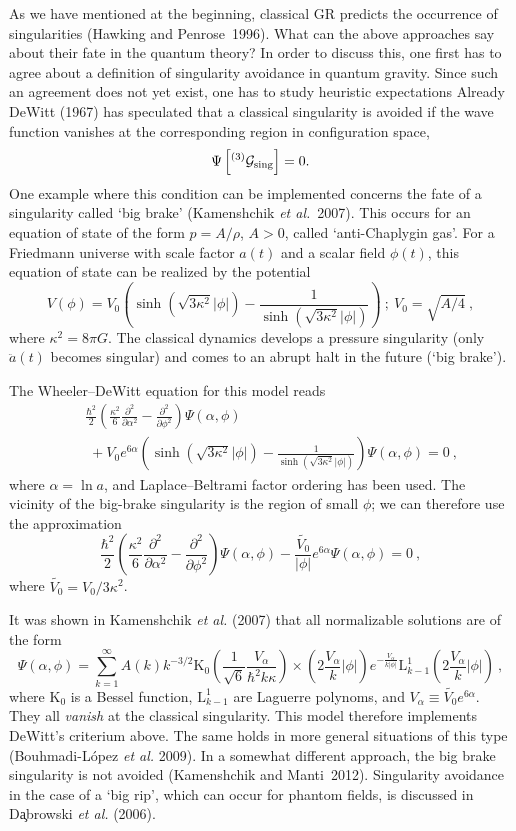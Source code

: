 \documentclass[12pt]{article}
\newcommand{\be}{\begin{equation}}
\newcommand{\ee}{\end{equation}}
\newcommand{\bea}{\begin{eqnarray}}
\newcommand{\eea}{\end{eqnarray}}
\newcommand{\lb}{\label}
\newcommand{\bdm}{\begin{displaymath}}
\newcommand{\edm}{\end{displaymath}}
\begin{document}
As we have mentioned at the beginning, classical GR predicts the
occurrence of singularities (Hawking and Penrose~1996). What can the
above approaches say about their fate in the quantum theory? In order
to discuss this, one first has to agree about a definition of
singularity avoidance in quantum gravity. Since such an agreement does
not yet exist, one has to study heuristic expectations
Already DeWitt (1967) has speculated that a classical singularity is avoided
if the wave function vanishes at the corresponding region in
configuration space,
\be
\lb{8.3.0}
\Psi\left[{}^{(3)} {\mathcal G}_{\rm sing}\right]=0.
\ee
One example where this condition can be implemented concerns the fate
of a singularity called `big brake' (Kamenshchik {\em et al.}~2007).
This occurs for an
equation of state of the form $p=A/\rho$, $A>0$, called
`anti-Chaplygin gas'. 
For a Friedmann
universe with scale factor $a(t)$ and a scalar field $\phi(t)$, this
equation of state can be realized by the potential
\bdm
V(\phi)=V_0\left(\sinh{\left(\sqrt{3\kappa^2}|\phi|\right)}-
\frac1{\sinh{\left(\sqrt{3\kappa^2}|\phi|\right)}}\right)\ ; \ V_0=\sqrt{A/4}\ ,
\edm
where $\kappa^2=8\pi G$.
The classical dynamics 
develops a pressure singularity (only $\ddot{a}(t)$ becomes singular)
and comes to an abrupt halt in the future (`big brake').

The Wheeler--DeWitt equation for this model reads
\bea
& & \frac{\hbar^2}{2}\left(\frac{\kappa^2}{6}\frac{\partial^2}
{\partial\alpha^2}-\frac{\partial^2}{\partial\phi^2}\right)\Psi\left(\alpha,
  \phi\right)\nonumber\\ & & \;
+V_0e^{6\alpha}\left(\sinh{\left(\sqrt{3\kappa^2}|\phi|\right)}
-\frac1{\sinh{\left(\sqrt{3\kappa^2}|\phi|\right)}}\right)\Psi\left(\alpha, 
  \phi\right)=0\ ,
\eea
where $\alpha=\ln a$, and Laplace--Beltrami factor ordering
has been used. 
The vicinity of the big-brake singularity is the region of small
$\phi$; we can therefore use the approximation
\bdm
\frac{\hbar^2}2\left(\frac{\kappa^2}{6}\frac{\partial^2}{\partial\alpha^2}
-\frac{\partial^2}{\partial\phi^2}\right)\Psi\left(\alpha,
  \phi\right)-\frac{\tilde{V_0}}{|\phi|}e^{6\alpha}\Psi\left(\alpha,
  \phi\right)=0\ ,
\edm
where $\tilde{V_0}={V_0}/{3\kappa^2}$.

It was shown in Kamenshchik {\em et al.} (2007) that all normalizable
solutions are of the form 
\bdm
\Psi\left(\alpha,\phi\right)=
\sum_{k=1}^{\infty}A(k)k^{-3/2}\mathrm{K}_0
\left(\frac{1}{\sqrt{6}}\frac{V_{\alpha}}{\hbar^2k\kappa}\right)
\times\left(2\frac{V_\alpha}{k}|\phi|\right)
e^{-\frac{V_\alpha}{k|\phi|}}\mathrm{L}^1_{k-1}
\left(2\frac{V_\alpha}{k}|\phi|\right)\ ,
\edm
where $\mathrm{K}_0$ is a Bessel function, $\mathrm{L}^1_{k-1}$ are Laguerre
polynoms, and $V_\alpha\equiv\tilde{V_0}e^{6\alpha}$. They all {\em
  vanish} at the classical singularity. This model therefore
implements DeWitt's criterium above. The same holds in more general
situations of this type (Bouhmadi-L\'opez {\em et al.} 2009). In a
somewhat different approach, the big brake singularity is not avoided
(Kamenshchik and Manti~2012). Singularity avoidance in the case of a
`big rip', which can occur for phantom fields, is discussed in
D\c{a}browski {\em et al.} (2006). 
\end{document}
